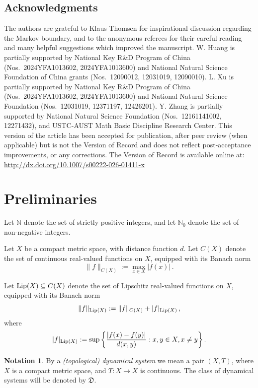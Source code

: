 \documentclass[reqno,11pt]{amsart}
\theoremstyle{definition}
\newtheorem{notation}[thm]{Notation}
\theoremstyle{remark}
\theoremstyle{remark}
\def \N {\mathbb N}
\def\lip{{\rm Lip}}
\def\D{\mathfrak{D}}
\numberwithin{equation}{section}
\begin{document}
\subsection*{Acknowledgments} The authors are grateful to Klaus Thomsen for inspirational discussion regarding the Markov boundary, and to the anonymous referees for their careful reading and many helpful suggestions which improved the manuscript.
W. Huang is partially supported by National Key R\&D Program of China (Nos.~2024YFA1013602, 2024YFA1013600) and National Natural Science Foundation of China grants (Nos.~12090012, 12031019, 12090010).
L. Xu is partially supported by National Key R\&D Program of China (Nos.~2024YFA1013602, 2024YFA1013600) and National Natural Science Foundation   (Nos.~12031019, 12371197, 12426201).
Y. Zhang is partially supported by National Natural Science Foundation (Nos.~12161141002, 12271432), and USTC-AUST Math Basic Discipline Research Center.
	This version of the article has been accepted for publication, after peer review (when applicable) but is 
not the Version of Record and does not reflect post-acceptance improvements, or any corrections. The Version of Record is 
available online at:
 \url{http://dx.doi.org/10.1007/s00222-026-01411-x}






\section{ Preliminaries}\label{preliminariessection}


Let $\N$ denote the set of strictly positive integers, and let $\N_0$ denote the set of non-negative integers.

Let $X$ be a compact metric space, with distance function $d$.
Let $C(X)$ denote the set of continuous real-valued functions on $X$, equipped with its Banach norm
$$\|f\|_{C(X)}
:=\max_{x\in X}|f(x)|\,.$$



Let $\lip(X)\subseteq C(X)$ denote the set of Lipschitz real-valued functions on $X$, equipped with its Banach norm
$$\|f\|_{\lip(X)}:= \|f\|_{C(X)} + |f|_{\lip(X)}\,,$$ where
$$|f|_{\lip(X)}:= \sup\left\{ \frac{|f(x)-f(y)|}{d(x,y)} : x,y\in X, x\neq y\right\}.$$

\begin{notation}
By a \emph{(topological) dynamical system} we mean a pair $(X,T)$, where $X$ is a compact metric space, and $T:X\to X$ is continuous.
The class of dynamical systems will be denoted by $\D$.
\end{notation}
\end{document}

